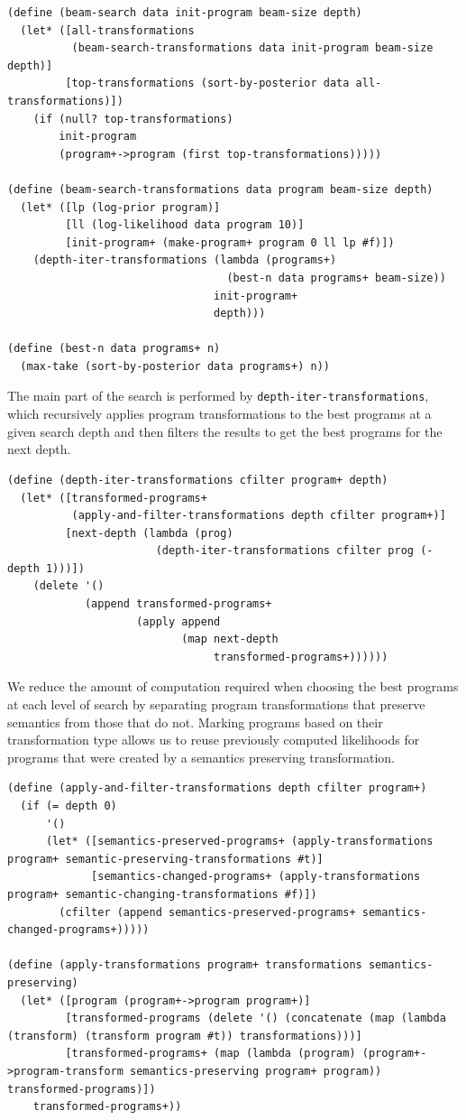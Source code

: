 \documentclass[a4paper,10pt]{article}
\begin{document}
\begin{lstlisting}[frame=trbl]
(define (beam-search data init-program beam-size depth)
  (let* ([all-transformations
          (beam-search-transformations data init-program beam-size depth)]
         [top-transformations (sort-by-posterior data all-transformations)])
    (if (null? top-transformations)
        init-program
        (program+->program (first top-transformations)))))

(define (beam-search-transformations data program beam-size depth)
  (let* ([lp (log-prior program)]
         [ll (log-likelihood data program 10)]
         [init-program+ (make-program+ program 0 ll lp #f)])
    (depth-iter-transformations (lambda (programs+)
                                  (best-n data programs+ beam-size))
                                init-program+
                                depth)))

(define (best-n data programs+ n)
  (max-take (sort-by-posterior data programs+) n))
\end{lstlisting}
The main part of the search is performed by \texttt{depth-iter-transformations}, which recursively applies program transformations to the best programs at a given search depth and then filters the results to get the best programs for the next depth.
\begin{lstlisting}[frame=trbl]
(define (depth-iter-transformations cfilter program+ depth)
  (let* ([transformed-programs+
          (apply-and-filter-transformations depth cfilter program+)]
         [next-depth (lambda (prog)
                       (depth-iter-transformations cfilter prog (- depth 1)))])
    (delete '()
            (append transformed-programs+
                    (apply append
                           (map next-depth
                                transformed-programs+))))))
\end{lstlisting}
We reduce the amount of computation required when choosing the best programs at each level of search by separating program transformations that preserve semantics from those that do not.  Marking programs based on their transformation type allows us to reuse previously computed likelihoods for programs that were created by a semantics preserving transformation.
\begin{lstlisting}[frame=trbl]
(define (apply-and-filter-transformations depth cfilter program+)
  (if (= depth 0)
      '()
      (let* ([semantics-preserved-programs+ (apply-transformations program+ semantic-preserving-transformations #t)]
             [semantics-changed-programs+ (apply-transformations program+ semantic-changing-transformations #f)])
        (cfilter (append semantics-preserved-programs+ semantics-changed-programs+)))))

(define (apply-transformations program+ transformations semantics-preserving)
  (let* ([program (program+->program program+)]
         [transformed-programs (delete '() (concatenate (map (lambda (transform) (transform program #t)) transformations)))]
         [transformed-programs+ (map (lambda (program) (program+->program-transform semantics-preserving program+ program)) transformed-programs)])
    transformed-programs+))
\end{lstlisting}
\end{document}
